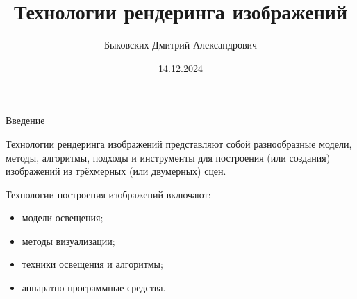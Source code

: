\documentclass{beamer}
\title[Image Rendering Technologies]{Технологии рендеринга изображений}
\author[Быковских Д.А.]{Быковских Дмитрий Александрович}
\date{14.12.2024}
\begin{document}
	\begin{frame}
		\titlepage
	\end{frame}

	\begin{frame}{Введение}

		Технологии рендеринга изображений представляют собой разнообразные модели, методы, алгоритмы, подходы и инструменты для построения (или создания) изображений из трёхмерных (или двумерных) сцен.

		Технологии построения изображений включают:
		\begin{itemize}
			\item модели освещения;
			\item методы визуализации;
			\item техники освещения и алгоритмы;
			\item аппаратно-программные средства.
		\end{itemize}

		\note{
		
		}

	\end{frame}
\end{document}

